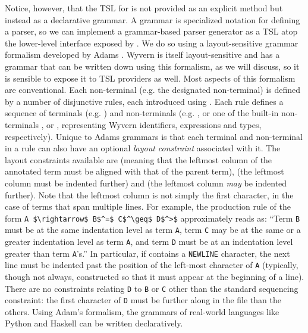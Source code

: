 Notice, however, that the TSL for  is not provided as an explicit  method but instead as a declarative grammar. A grammar is specialized notation for defining a parser, so we can implement a  grammar-based parser generator  as a TSL atop the lower-level interface exposed by . We do so using a layout-sensitive grammar formalism developed by Adams \cite{Adams:2013:PPI:2429069.2429129}. Wyvern is itself layout-sensitive and has a grammar that can be written down using this formalism, as we will discuss, so it is sensible to expose it to TSL providers as well. Most aspects of this formalism are conventional. 
Each non-terminal (e.g. the designated  non-terminal) is defined by a number of disjunctive rules, each introduced using \li{<-}. Each rule defines a sequence of terminals (e.g. ) and non-terminals (e.g. , or one of the built-in non-terminals ,  or , representing Wyvern identifiers, expressions and types, respectively). Unique to Adams grammars is that each terminal and non-terminal in a rule can also have an optional \emph{layout constraint} associated with it. The layout constraints available are \li{=} (meaning that the leftmost column of the annotated term must be aligned with that of the parent term), \li{>} (the leftmost column must be indented further) and \li{>=} (the leftmost column \emph{may} be indented further). Note that the leftmost column is not simply the first character, in the case of terms that span multiple lines. For example, the production rule of the form \lstinline{A $\rightarrow$ B$^=$ C$^\geq$ D$^>$} approximately reads as: ``Term \lstinline{B} must be at the same indentation level as term \lstinline{A}, term \lstinline{C} may be at the same or a greater indentation level as term \lstinline{A}, and term \lstinline{D} must be at an indentation level greater than term \lstinline{A}'s.'' In particular, if  contains a \lstinline{NEWLINE} character, the next line must be indented past the position of the left-most character of \lstinline{A} (typically, though not always, constructed so that it must appear at the beginning of a line). There are no constraints relating \lstinline{D} to \lstinline{B} or \lstinline{C} other than the standard sequencing constraint: the first character of \lstinline{D} must be further along in the file than the others. Using Adam's formalism, the grammars of real-world languages like Python and Haskell can be written declaratively.

